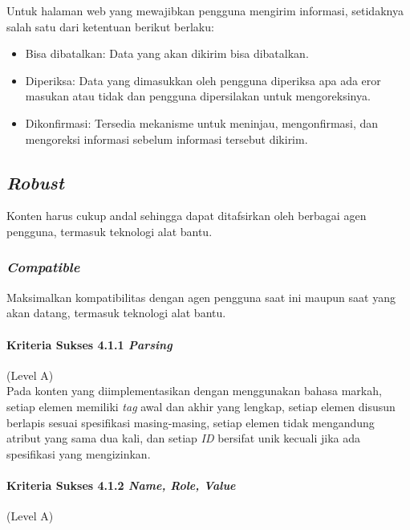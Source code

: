 Untuk halaman web yang mewajibkan pengguna mengirim informasi, setidaknya salah satu dari ketentuan berikut berlaku:
\begin{itemize}
	\item Bisa dibatalkan: Data yang akan dikirim bisa dibatalkan.
	\item Diperiksa: Data yang dimasukkan oleh pengguna diperiksa apa ada eror masukan atau tidak dan pengguna dipersilakan untuk mengoreksinya.
	\item Dikonfirmasi: Tersedia mekanisme untuk meninjau, mengonfirmasi, dan mengoreksi informasi sebelum informasi tersebut dikirim.
\end{itemize}


\subsection{\textit{Robust}}
\label{sec:robust}
Konten harus cukup andal sehingga dapat ditafsirkan oleh berbagai agen pengguna, termasuk teknologi alat bantu.

\subsubsection{\textit{Compatible}}
\label{sec:compatible}
Maksimalkan kompatibilitas dengan agen pengguna saat ini maupun saat yang akan datang, termasuk teknologi alat bantu.

\paragraph{Kriteria Sukses 4.1.1 \textit{Parsing}}
\label{sec:kriteria_sukses_4.1.1}
(Level A)\\

Pada konten yang diimplementasikan dengan menggunakan bahasa markah, setiap elemen memiliki \textit{tag} awal dan akhir yang lengkap, setiap elemen disusun berlapis sesuai spesifikasi masing-masing, setiap elemen tidak mengandung atribut yang sama dua kali, dan setiap \textit{ID} bersifat unik kecuali jika ada spesifikasi yang mengizinkan.

\paragraph{Kriteria Sukses 4.1.2 \textit{Name, Role, Value}}
\label{sec:kriteria_sukses_4.1.2}
(Level A)\\

